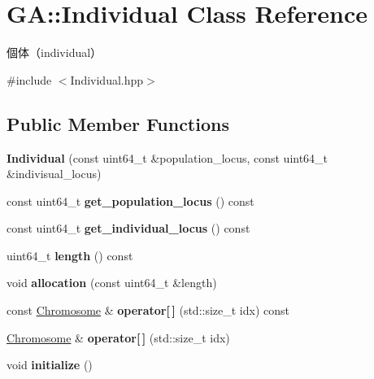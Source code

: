 \hypertarget{class_g_a_1_1_individual}{}\section{GA\+::Individual Class Reference}
\label{class_g_a_1_1_individual}


個体（individual）  




{\ttfamily \#include $<$Individual.\+hpp$>$}

\subsection*{Public Member Functions}
\begin{DoxyCompactItemize}
\item 
\mbox{\label{class_g_a_1_1_individual_afe771f951d8ce9b807e70c190d69b789}} 
{\bfseries Individual} (const uint64\+\_\+t \&population\+\_\+locus, const uint64\+\_\+t \&indivisual\+\_\+locus)
\item 
\mbox{\label{class_g_a_1_1_individual_a6349cf4b04cc9cd63c02cb4ee88a5a0a}} 
const uint64\+\_\+t {\bfseries get\+\_\+population\+\_\+locus} () const
\item 
\mbox{\label{class_g_a_1_1_individual_a9a44596dc37dd943251ae3765377f3cf}} 
const uint64\+\_\+t {\bfseries get\+\_\+individual\+\_\+locus} () const
\item 
\mbox{\label{class_g_a_1_1_individual_afbe6128365e7286608a128381ce727f1}} 
uint64\+\_\+t {\bfseries length} () const
\item 
\mbox{\label{class_g_a_1_1_individual_a4b5f35bd833656932a7cbdc443af5a41}} 
void {\bfseries allocation} (const uint64\+\_\+t \&length)
\item 
\mbox{\label{class_g_a_1_1_individual_a93ca941721f5d7f5d25acd46ea040e43}} 
const \mbox{\hyperlink{class_g_a_1_1_chromosome}{Chromosome}} \& {\bfseries operator\mbox{[}$\,$\mbox{]}} (std\+::size\+\_\+t idx) const
\item 
\mbox{\label{class_g_a_1_1_individual_ad553827fd98c6e07434593cba12047f7}} 
\mbox{\hyperlink{class_g_a_1_1_chromosome}{Chromosome}} \& {\bfseries operator\mbox{[}$\,$\mbox{]}} (std\+::size\+\_\+t idx)
\item 
\mbox{\label{class_g_a_1_1_individual_a4d06751b523554d306aae3574f2254d8}} 
void {\bfseries initialize} ()
\end{DoxyCompactItemize}
